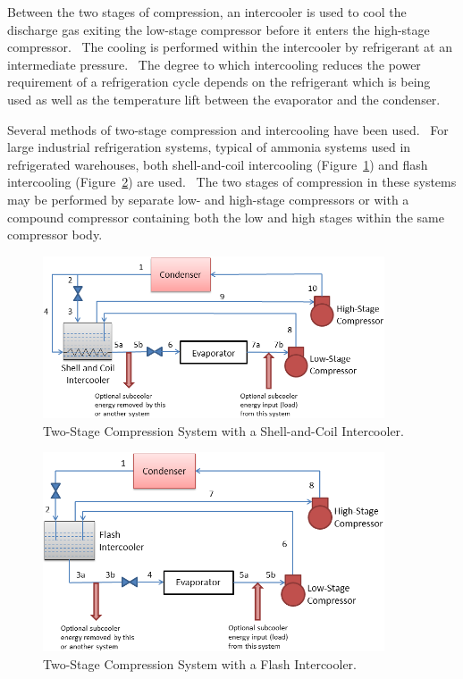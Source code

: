 Between the two stages of compression, an intercooler is used to cool the discharge gas exiting the low-stage compressor before it enters the high-stage compressor.~ The cooling is performed within the intercooler by refrigerant at an intermediate pressure.~ The degree to which intercooling reduces the power requirement of a refrigeration cycle depends on the refrigerant which is being used as well as the temperature lift between the evaporator and the condenser.

Several methods of two-stage compression and intercooling have been used.~ For large industrial refrigeration systems, typical of ammonia systems used in refrigerated warehouses, both shell-and-coil intercooling (Figure~\ref{fig:two-stage-compression-system-with-a-shell}) and flash intercooling (Figure~\ref{fig:two-stage-compression-system-with-a-flash}) are used.~ The two stages of compression in these systems may be performed by separate low- and high-stage compressors or with a compound compressor containing both the low and high stages within the same compressor body.

\begin{figure}[hbtp] %
\centering
\includegraphics[width=0.9\textwidth, height=0.9\textheight, keepaspectratio=true]{media/image6278.png}
\caption{  Two-Stage Compression System with a Shell-and-Coil Intercooler. \protect \label{fig:two-stage-compression-system-with-a-shell}}
\end{figure}

\begin{figure}[hbtp] %
\centering
\includegraphics[width=0.9\textwidth, height=0.9\textheight, keepaspectratio=true]{media/image6279.png}
\caption{  Two-Stage Compression System with a Flash Intercooler. \protect \label{fig:two-stage-compression-system-with-a-flash}}
\end{figure}

